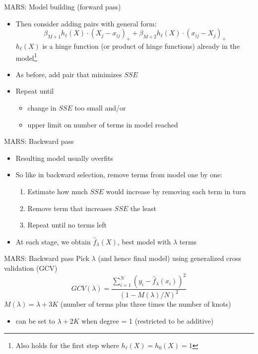 \documentclass[handout]{beamer}
\begin{document}
\begin{frame}{MARS: Model building (forward pass)}
  \begin{itemize}[<+->]
    \item Then consider adding pairs with general form:
  \begin{equation*} \label{eq:gen-pairs-add}
    \beta_{M + 1} h_{\ell}(X) \cdot (X_{j} - x_{ij})_{+} + \beta_{M + 2} h_{\ell}(X) \cdot (x_{ij} - X_{j})_{+}
  \end{equation*}
  $h_{\ell}(X)$ is a hinge function (or product of hinge functions) already in the model\footnote{Also holds for the first step where $h_{\ell}(X) = h_{0}(X) = 1$}
  \item As before, add pair that minimizes $SSE$
  \item Repeat until 
  \begin{itemize}
    \item change in $SSE$ too small and/or
    \item upper limit on number of terms in model reached
  \end{itemize}
  \end{itemize}
\end{frame}

\begin{frame}{MARS: Backward pass}
  \begin{itemize}[<+->]
    \item Resulting model usually overfits
    \item So like in backward selection, remove terms from model one by one:
    \begin{enumerate}
      \item Estimate how much $SSE$ would increase by removing each term in turn
      \item Remove term that increases $SSE$ the least
      \item Repeat until no terms left
    \end{enumerate}
    \item At each stage, we obtain $\hat{f}_{\lambda}(X)$, best model with $\lambda$ terms
  \end{itemize}

\end{frame}

\begin{frame}{MARS: Backward pass}
Pick $\lambda$ (and hence final model) using generalized cross validation (GCV) 
    \begin{equation*}
    GCV(\lambda) =
      \frac{
        \sum_{i = 1}^{N}(y_{i} - \hat{f}_{\lambda}(x_{i}))^2
      }{
        (1 - M(\lambda)/N)^2
      }
  \end{equation*}
  $M(\lambda) = \lambda + 3K$ (number of terms plus three times the number of knots)
  \begin{itemize}
    \item<+-> can be set to $\lambda + 2K$ when degree = 1 (restricted to be additive)
  \end{itemize}

\end{frame}
\end{document}
